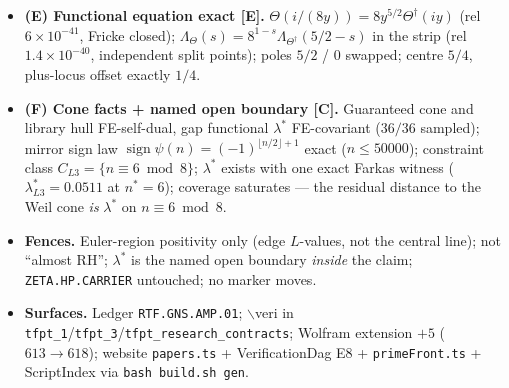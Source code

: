 \documentclass[11pt]{article}
\providecommand{\mE}{\textbf{[E]}}\providecommand{\mC}{\textbf{[C]}}
\begin{document}
\begin{itemize}[leftmargin=1.5em]
(layer $[1,1,1,1]$); $Q=Q_\zeta(g_-)+Q_\zeta(g_+)$ (rel $2\times10^{-15}$); the
$\flat$/doubling kernel enters \emph{with plus} (sign inverted vs the v539 square-plane minus).
\item \textbf{(E) Functional equation exact \mE.}
$\Theta(i/(8y))=8y^{5/2}\Theta^\dagger(iy)$ (rel $6\times10^{-41}$, Fricke closed);
$\Lambda_\Theta(s)=8^{1-s}\Lambda_{\Theta^\dagger}(5/2-s)$ in the strip (rel $1.4\times10^{-40}$,
independent split points); poles $5/2$ / $0$ swapped; centre $5/4$, plus-locus offset exactly $1/4$.
\item \textbf{(F) Cone facts + named open boundary \mC.} Guaranteed cone and library hull
FE-self-dual, gap functional $\lambda^*$ FE-covariant ($36/36$ sampled); mirror sign law
$\operatorname{sign}\psi(n)=(-1)^{\lfloor n/2\rfloor+1}$ exact ($n\le50000$); constraint class
$C_{L3}=\{n\equiv6\bmod 8\}$; $\lambda^*$ exists with one exact Farkas witness
($\lambda^*_{L3}=0.0511$ at $n^*=6$); coverage saturates --- the residual distance to the Weil
cone \emph{is} $\lambda^*$ on $n\equiv6\bmod 8$.
\item \textbf{Fences.} Euler-region positivity only (edge $L$-values, not the central line);
not ``almost RH''; $\lambda^*$ is the named open boundary \emph{inside} the claim;
\texttt{ZETA.HP.CARRIER} untouched; no marker moves.
\item \textbf{Surfaces.} Ledger \texttt{RTF.GNS.AMP.01}; $\backslash$veri in
\texttt{tfpt\_1}/\texttt{tfpt\_3}/\texttt{tfpt\_research\_contracts}; Wolfram extension $+5$
($613\to618$); website \texttt{papers.ts} + VerificationDag E8 + \texttt{primeFront.ts} +
ScriptIndex via \texttt{bash build.sh gen}.
\end{itemize}
\end{document}
